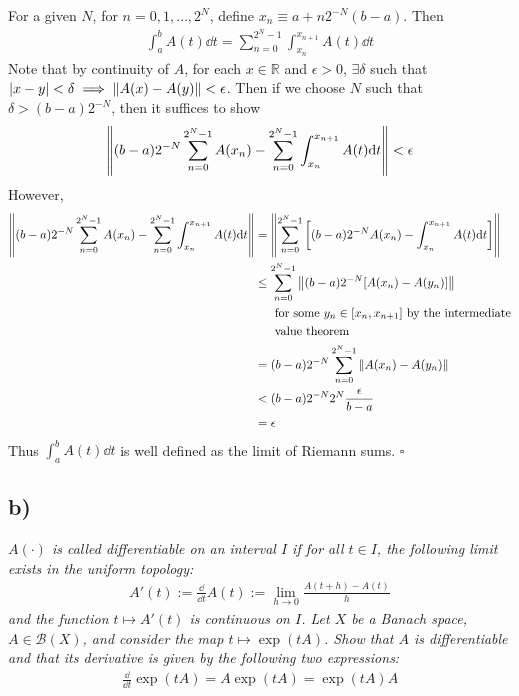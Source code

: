 \documentclass[12pt]{article}
\theoremstyle{plain}
\begin{document}
For a given $N$, for $n = 0, 1, \dots, 2^N$, define $x_n \equiv a + n2^{-N}(b-a)$.  Then
\begin{align*}
    \int_a^b A(t) \dd t = \sum_{n=0}^{2^N - 1} \int_{x_n}^{x_{n+1}} A(t)\dd t
\end{align*}
Note that by continuity of $A$, for each $x \in \mathbb{R}$ and $\epsilon > 0$, $\exists \delta$ such that $|x - y| < \delta \implies \norm{A(x) - A(y)} < \epsilon$.  Then if we choose $N$ such that $\delta > (b-a)2^{-N}$, then it suffices to show
\begin{align*}
    \norm{(b-a)2^{-N}\sum_{n=0}^{2^N-1}A(x_n) - \sum_{n=0}^{2^N-1}\int_{x_n}^{x_{n+1}}A(t)\dd t} < \epsilon
\end{align*}
However, 
\begin{align*}
    \norm{(b-a)2^{-N}\sum_{n=0}^{2^N-1}A(x_n) - \sum_{n=0}^{2^N-1}\int_{x_n}^{x_{n+1}}A(t)\dd t} &= \norm{\sum_{n=0}^{2^N-1}\qty[(b-a)2^{-N}A(x_n) - \int_{x_n}^{x_{n+1}} A(t) \dd t]} \\
    &\leq \sum_{n=0}^{2^N-1}\norm{(b-a)2^{-N}\qty[A(x_n) - A(y_n)]} \\
    &\ \ \ \ \ \text{for some $y_n \in [x_n, x_{n+1}]$ by the intermediate} \\
    &\ \ \ \ \ \text{value theorem} \\
    &= (b-a)2^{-N}\sum_{n=0}^{2^N-1}\norm{A(x_n) - A(y_n)} \\
    &< (b-a)2^{-N}2^N\frac{\epsilon}{b-a} \\
    &= \epsilon
\end{align*}
Thus $\displaystyle\int_a^b A(t) \dd t$ is well defined as the limit of Riemann sums. \hfill $\square$

\subsection*{ b)}
\emph{$A(\cdot)$ is called differentiable on an interval $I$ if for all $t \in I$, the following limit exists in the uniform topology:}
\begin{align*}
    A'(t) := \frac{\dd}{\dd t}A(t) := \lim_{h\rightarrow 0}\frac{A(t+h) - A(t)}{h}
\end{align*}
\emph{and the function $t \mapsto A'(t)$ is continuous on $I$.  Let $X$ be a Banach space, $A \in \mathcal{B}(X)$, and consider the map $t \mapsto \exp(tA)$.  Show that $A$ is differentiable and that its derivative is given by the following two expressions:}
\begin{align*}
    \frac{\dd}{\dd t}\exp(tA) = A\exp(tA) = \exp(tA)A
\end{align*}
\end{document}
